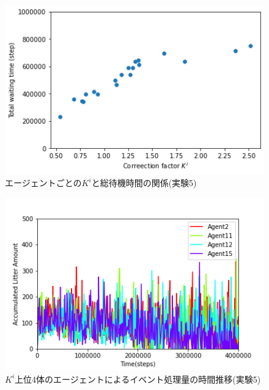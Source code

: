 \documentclass[12pt,a4j,twoside]{jarticle}
\begin{document}
  \begin{figure}
    \centering
    \includegraphics[width=150mm]{figures/CorrectionScatter_Office_ERL.png}
    \caption{エージェントごとの$K^i$と総待機時間の関係(実験5)}
    \label{fig:cscatter_ERL_Office}
  \end{figure}

  \begin{figure}
    \centering
    \includegraphics[width=150mm]{figures/al_graph_ERL_Office_top.png}
    \caption{$K^i$上位4体のエージェントによるイベント処理量の時間推移(実験5)}
    \label{fig:al_ERL_Office_top}
  \end{figure}
\end{document}
